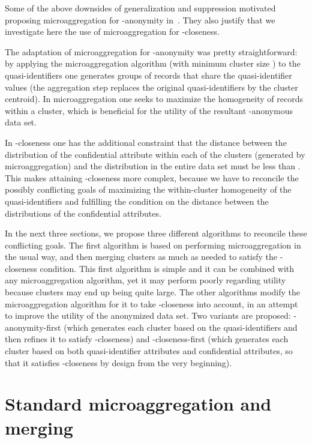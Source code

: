 \documentclass[10pt,journal,compsoc]{IEEEtran}
\theoremstyle{definition}
\theoremstyle{plain}
\begin{document}
Some of the above downsides of generalization and suppression motivated
proposing microaggregation for -anonymity 
in~\cite{Domingo2005Ordinal}. They also justify that we   
investigate here the use of microaggregation 
for -closeness.





The adaptation of microaggregation  for -anonymity
was pretty straightforward: by applying the microaggregation algorithm
(with minimum cluster size ) to the quasi-identifiers one generates
groups of  records that share the quasi-identifier values (the
aggregation step replaces the original quasi-identifiers by the cluster
centroid). In microaggregation one seeks to maximize the homogeneity
of records within a cluster, which is beneficial for the utility of
the resultant -anonymous data set. 

In -closeness one has   
the additional constraint that the distance between 
the distribution of the confidential attribute within each of the clusters 
(generated by microaggregation)
and the distribution in the entire data set must be less than .
This makes attaining -closeness more complex, because we have
to reconcile the possibly conflicting goals of maximizing the 
within-cluster homogeneity of the quasi-identifiers and 
fulfilling the condition on the distance between the distributions
of the confidential attributes.


In the next three sections, we propose three different algorithms 
to reconcile these conflicting goals.
The first algorithm is based on performing microaggregation in 
the usual way, 
and then merging clusters as much as needed 
to satisfy the -closeness condition. This first algorithm
is simple and it can be combined with any microaggregation algorithm,
yet it may perform poorly regarding utility because clusters 
may end up being quite large.
The other algorithms modify the
microaggregation algorithm for it to take -closeness into account,
in an attempt to improve the utility of the anonymized data set. Two
variants are proposed: -anonymity-first (which generates each cluster
based on the quasi-identifiers and then refines it to satisfy -closeness)
and -closeness-first (which generates each cluster 
based on both quasi-identifier
attributes and confidential attributes, so that it satisfies -closeness
by design from the very beginning). 

\section{Standard microaggregation and merging\label{sub:micro_merge}}
\end{document}
